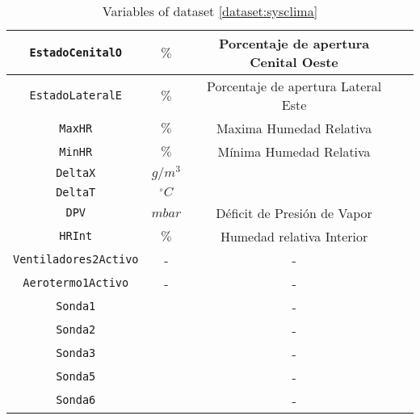\begin{table}
\begin{tabular}{|c|c|c|c|}
        \texttt{EstadoCenitalO}     & $\%$           & Porcentaje de apertura Cenital Oeste     \\ \hline
        \texttt{EstadoLateralE}     & $\%$           & Porcentaje de apertura Lateral Este      \\ \hline
        \texttt{MaxHR}              & $\%$           & Maxima Humedad Relativa      \\ \hline
        \texttt{MinHR}              & $\%$           & Mínima Humedad Relativa      \\ \hline
        \texttt{DeltaX}             & $g/m^3$        &                              \\ \hline
        \texttt{DeltaT}             & $^\circ C$     &                              \\ \hline
        \texttt{DPV}                & $mbar$         & Déficit de Presión de Vapor  \\  \hline
        \texttt{HRInt}              & $\%$           & Humedad relativa Interior    \\ \hline
        \texttt{Ventiladores2Activo}&    -            &         -                    \\ \hline
        \texttt{Aerotermo1Activo}   &    -           &         -                    \\ \hline
        \texttt{Sonda1}             &                &         -                    \\ \hline
        \texttt{Sonda2}             &                &         -                    \\ \hline
        \texttt{Sonda3}             &                &         -                    \\ \hline
        \texttt{Sonda5}             &                &         -                    \\ \hline
        \texttt{Sonda6}             &                &         -                    \\
        \hline
    \end{tabular}
    \caption{Variables of dataset \ref{dataset:sysclima}}
    \label{table:SysClimaDS}
\end{table}